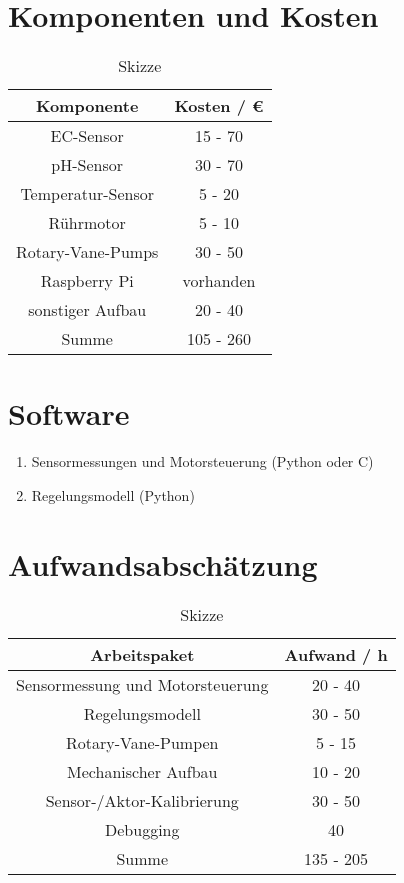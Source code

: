 \section*{Komponenten und Kosten}
\begin{table}[H]
    \centering
    \caption{
        Skizze
    }
    \begin{tabular}{| c | c |}
        \hline
        Komponente &  Kosten / \euro{}\\
        \hline
        EC-Sensor & 15 - 70  \\
        \hline
        pH-Sensor & 30 - 70  \\
        \hline
        Temperatur-Sensor & 5 - 20  \\
        \hline
        Rührmotor & 5 - 10  \\
        \hline
        Rotary-Vane-Pumps & 30 - 50  \\
        \hline
        Raspberry Pi & vorhanden  \\
        \hline
        sonstiger Aufbau & 20 - 40  \\
        \hline
        \hline
        Summe & 105 - 260  \\
        \hline
    \end{tabular}
    \label{tab:Komponenten}
\end{table}


\section*{Software}
\begin{enumerate}
    \item Sensormessungen und Motorsteuerung (Python oder C)
    \item Regelungsmodell (Python)
\end{enumerate}

\section*{Aufwandsabschätzung}
\begin{table}[H]
    \centering
    \caption{
        Skizze
    }
    \begin{tabular}{| c | c |}
        \hline
        Arbeitspaket &  Aufwand / h\\
        \hline
        Sensormessung und Motorsteuerung & 20 - 40  \\
        \hline
        Regelungsmodell & 30 - 50  \\
        \hline
        Rotary-Vane-Pumpen & 5 - 15  \\
        \hline
        Mechanischer Aufbau & 10 - 20  \\
        \hline
        Sensor-/Aktor-Kalibrierung & 30 - 50  \\
        \hline
        Debugging & 40 \\
        \hline
        \hline
        Summe & 135 - 205  \\
        \hline
    \end{tabular}
    \label{tab:Aufwand}
\end{table}
